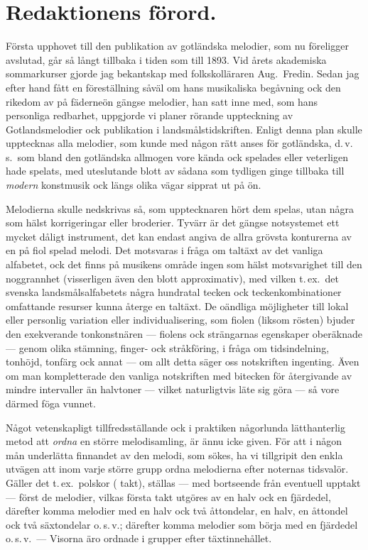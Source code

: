 \documentclass[a4paper,english]{article}
\begin{document}
\section{Redaktionens förord.}
Första upphovet till den publikation av gotländska melodier,
som nu föreligger avslutad, går så långt tillbaka i tiden som till
1893. Vid årets akademiska sommarkurser gjorde jag bekantskap
med folkskolläraren Aug.\ Fredin. Sedan jag efter hand fått en
föreställning såväl om hans musikaliska begåvning ock den rikedom
av på fäderneön gängse melodier, han satt inne med, som hans
personliga redbarhet, uppgjorde vi planer rörande uppteckning av
Gotlandsmelodier ock publikation i landsmålstidskriften. Enligt denna
plan skulle upptecknas alla melodier, som kunde med någon rätt
anses för gotländska, d.\,v.\,s.\ som bland den gotländska allmogen vore
kända ock spelades eller veterligen hade spelats, med uteslutande
blott av sådana som tydligen ginge tillbaka till \textit{modern} konstmusik
ock längs olika vägar sipprat ut på ön.

Melodierna skulle nedskrivas så, som upptecknaren hört dem
spelas, utan några som hälst korrigeringar eller broderier. Tyvärr
är det gängse notsystemet ett mycket dåligt instrument, det kan
endast angiva de allra grövsta konturerna av en på fiol spelad
melodi. Det motsvaras i fråga om taltäxt av det vanliga alfabetet,
ock det finns på musikens område ingen som hälst motsvarighet till
den noggrannhet (visserligen även den blott approximativ), med vilken
t.\,ex.\ det svenska landsmålsalfabetets några hundratal tecken ock
teckenkombinationer omfattande resurser kunna återge en taltäxt.
De oändliga möjligheter till lokal eller personlig variation eller
individualisering, som fiolen (liksom rösten) bjuder den exekverande
tonkonstnären --- fiolens ock strängarnas egenskaper oberäknade ---
genom olika stämning, finger- ock stråkföring, i fråga om tidsindelning,
tonhöjd, tonfärg ock annat --- om allt detta säger oss notskriften
ingenting. Även om man kompletterade den vanliga notskriften
med bitecken för återgivande av mindre intervaller än halvtoner ---
vilket naturligtvis läte sig göra --- så vore därmed föga vunnet.

Något vetenskapligt tillfredsställande ock i praktiken någorlunda
lätthanterlig metod att \textit{ordna} en större melodisamling, är
ännu icke given. För att i någon mån underlätta finnandet av den melodi,
som sökes, ha vi tillgripit den enkla utvägen att inom varje större
grupp ordna melodierna efter noternas tidsvalör. Gäller det t.\,ex.\ 
polskor ( takt), ställas --- med bortseende från eventuell upptakt
--- först de melodier, vilkas första takt utgöres av en halv ock en
fjärdedel, därefter komma melodier med en halv ock två åttondelar,
en halv, en åttondel ock två säxtondelar o.\,s.\,v.; därefter komma
melodier som börja med en fjärdedel o.\,s.\,v.\ --- Visorna äro
ordnade i grupper efter täxtinnehållet.
\end{document}
